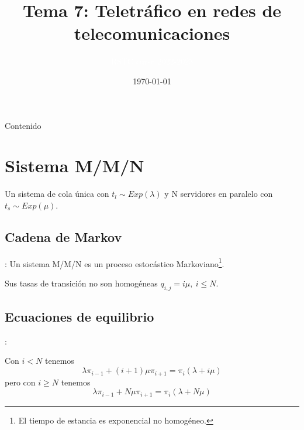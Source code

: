 \documentclass[xcolor={x11names}]{beamer}
\title[Tema 7]{Tema 7: Teletráfico en redes de telecomunicaciones}
\author{\textcolor{white}{RSTC curso 2022-2023}}
\date{\today}
\begin{document}
\frame{\titlepage}


\begin{frame}[allowframebreaks]{Contenido}
    \tableofcontents
\end{frame}


\section{Sistema M/M/N}
\begin{frame}{\secname}
    Un sistema de cola única
    con $t_l\sim Exp(\lambda)$
    y N servidores en paralelo
    con $t_s\sim Exp(\mu)$.
    \begin{figure}
        
    \end{figure}
\end{frame}


\subsection{Cadena de Markov}
\begin{frame}{\secname: \subsecname}
    Un sistema M/M/N es un proceso
    estocástico Markoviano\footnote{
    El tiempo de estancia es
    exponencial no homogéneo.}.
    \begin{figure}
        \resizebox{!}{.2\textwidth}{%
            
        }
    \end{figure}
    Sus tasas de transición no son
    homogéneas $q_{i,j}=i\mu,\ i\leq N$.
    \begin{figure}
        \resizebox{!}{.2\textwidth}{%
            
        }
    \end{figure}
\end{frame}



\subsection{Ecuaciones de equilibrio}
\begin{frame}{\secname: \subsecname}
    \begin{figure}
        \resizebox{!}{.2\textwidth}{%
            
        }
    \end{figure}
    Con $i<N$ tenemos
    \begin{equation*}
        \lambda\pi_{i-1}
        +(i+1)\mu\pi_{i+1}
        = \pi_i(\lambda+i\mu)
    \end{equation*}
    pero con $i\geq N$ tenemos
    \begin{equation*}
        \lambda\pi_{i-1}
        +N\mu\pi_{i+1}
        = \pi_i(\lambda+N\mu)
    \end{equation*}
\end{frame}
\end{document}
